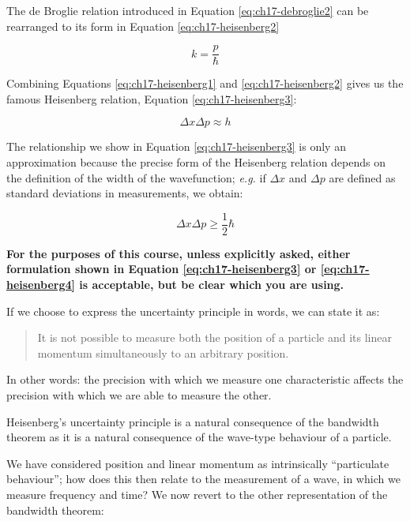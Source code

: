 \documentclass[
]{book}
\begin{document}
The de Broglie relation introduced in Equation \eqref{eq:ch17-debroglie2} can be rearranged to its form in Equation \eqref{eq:ch17-heisenberg2}

\begin{equation}
k = \frac{p}{\hbar}
\label{eq:ch17-heisenberg2}
\end{equation}

Combining Equations \eqref{eq:ch17-heisenberg1} and \eqref{eq:ch17-heisenberg2} gives us the famous Heisenberg relation, Equation \eqref{eq:ch17-heisenberg3}:

\begin{equation}
 \Delta x \Delta p \approx h
 \label{eq:ch17-heisenberg3}
\end{equation}

The relationship we show in Equation \eqref{eq:ch17-heisenberg3} is only an approximation because the precise form of the Heisenberg relation depends on the definition of the width of the wavefunction; \emph{e.g.} if \(\Delta x\) and \(\Delta p\) are defined as standard deviations in measurements, we obtain:

\begin{equation}
 \Delta x \Delta p \geq \frac{1}{2}\hbar
 \label{eq:ch17-heisenberg4}
\end{equation}

\textbf{For the purposes of this course, unless explicitly asked, either formulation shown in Equation \eqref{eq:ch17-heisenberg3} or \eqref{eq:ch17-heisenberg4} is acceptable, but be clear which you are using.}

If we choose to express the uncertainty principle in words, we can state it as:

\begin{quote}
It is not possible to measure both the position of a particle and its linear momentum simultaneously to an arbitrary position.
\end{quote}

In other words: the precision with which we measure one characteristic affects the precision with which we are able to measure the other.

Heisenberg's uncertainty principle is a natural consequence of the bandwidth theorem as it is a natural consequence of the wave-type behaviour of a particle.

We have considered position and linear momentum as intrinsically ``particulate behaviour''; how does this then relate to the measurement of a wave, in which we measure frequency and time? We now revert to the other representation of the bandwidth theorem:
\end{document}
